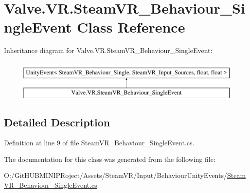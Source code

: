 \hypertarget{class_valve_1_1_v_r_1_1_steam_v_r___behaviour___single_event}{}\section{Valve.\+V\+R.\+Steam\+V\+R\+\_\+\+Behaviour\+\_\+\+Single\+Event Class Reference}
\label{class_valve_1_1_v_r_1_1_steam_v_r___behaviour___single_event}
Inheritance diagram for Valve.\+V\+R.\+Steam\+V\+R\+\_\+\+Behaviour\+\_\+\+Single\+Event\+:\begin{figure}[H]
\begin{center}
\leavevmode
\includegraphics[height=2.000000cm]{class_valve_1_1_v_r_1_1_steam_v_r___behaviour___single_event}
\end{center}
\end{figure}


\subsection{Detailed Description}


Definition at line 9 of file Steam\+V\+R\+\_\+\+Behaviour\+\_\+\+Single\+Event.\+cs.



The documentation for this class was generated from the following file\+:\begin{DoxyCompactItemize}
\item 
O\+:/\+Git\+H\+U\+B\+M\+I\+N\+I\+P\+Roject/\+Assets/\+Steam\+V\+R/\+Input/\+Behaviour\+Unity\+Events/\mbox{\hyperlink{_steam_v_r___behaviour___single_event_8cs}{Steam\+V\+R\+\_\+\+Behaviour\+\_\+\+Single\+Event.\+cs}}\end{DoxyCompactItemize}
